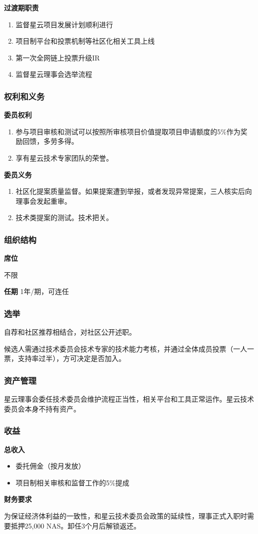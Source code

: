\textbf{过渡期职责}
\begin{enumerate}
	\item 监督星云项目发展计划顺利进行
	\item 项目制平台和投票机制等社区化相关工具上线
	\item 第一次全网链上投票升级IR
	\item 监督星云理事会选举流程
\end{enumerate}

\subsubsection{权利和义务}
\textbf{委员权利}
\begin{enumerate}
	\item 参与项目审核和测试可以按照所审核项目价值提取项目申请额度的5\%作为奖励回馈，多劳多得。
	\item 享有星云技术专家团队的荣誉。
\end{enumerate}

\textbf{委员义务}

\begin{enumerate}
	\item 社区化提案质量监督。如果提案遭到举报，或者发现异常提案，三人核实后向理事会发起重审。
	\item 技术类提案的测试。技术把关。
\end{enumerate}

\subsubsection{组织结构}
\textbf{席位}

不限
\vskip 10pt

\textbf{任期}
1年/期，可连任

\subsubsection{选举}
自荐和社区推荐相结合，对社区公开述职。

候选人需通过技术委员会技术专家的技术能力考核，并通过全体成员投票（一人一票，支持率过半），方可决定是否加入。

\subsubsection{资产管理}
星云理事会委任技术委员会维护流程正当性，相关平台和工具正常运作。星云技术委员会本身不持有资产。

\subsubsection{收益}
\textbf{总收入}
\begin{itemize}
	\item 委托佣金（按月发放）
	\item 项目制相关审核和监督工作的5\%提成
\end{itemize}

\textbf{财务要求}

为保证经济体利益的一致性，和星云技术委员会政策的延续性，理事正式入职时需要抵押25,000 NAS。卸任3个月后解锁返还。

